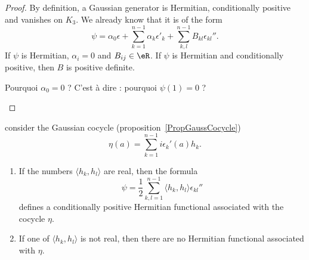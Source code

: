 \begin{proof}
    By definition, a Gaussian generator is Hermitian, conditionally positive and vanishes on $K_3$. We already know that it is of the form
    \begin{equation}        \label{EqFormgenpsiGauss}
        \psi=\alpha_0\epsilon+\sum_{k=1}^{n-1}\alpha_k\epsilon'_k+\sum_{k,l}^{n-1}B_{kl}\epsilon_{kl}''.
    \end{equation}
    If $\psi$ is Hermitian, $\alpha_i=0$ and $B_{ij}\in \eR$. If $\psi$ is Hermitian and conditionally positive, then $B$ is positive definite.

    \begin{probleme}
        Pourquoi $\alpha_0=0$ ? C'est à dire : pourquoi $\psi(1)=0$ ?
    \end{probleme}

\end{proof}

\begin{proposition}
    consider the Gaussian cocycle (proposition~\ref{PropGaussCocycle})
    \begin{equation}
        \eta(a)=\sum_{k=1}^{n-1}i\epsilon_k'(a)h_k.
    \end{equation}
    \begin{enumerate}
        \item
            If the numbers $\langle h_k, h_l\rangle $ are real, then the formula
            \begin{equation}
                \psi=\frac{ 1 }{2}\sum_{k,l=1}^{n-1}\langle h_k, h_l\rangle \epsilon_{kl}''
            \end{equation}
            defines a conditionally positive Hermitian functional associated with the cocycle $\eta$.

        \item
            If one of $\langle h_k, h_l\rangle $ is not real, then there are no Hermitian functional associated with $\eta$.
    \end{enumerate}

\end{proposition}

